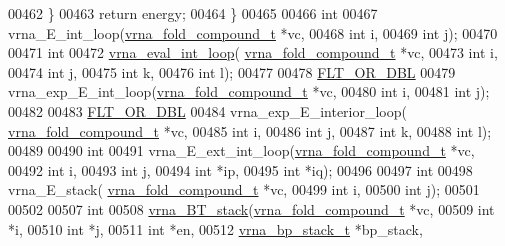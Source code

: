 \begin{DoxyCode}
00462   \}
00463   \textcolor{keywordflow}{return} energy;
00464 \}
00465 
00466 \textcolor{keywordtype}{int}
00467 vrna\_E\_int\_loop(\hyperlink{group__fold__compound_structvrna__fc__s}{vrna\_fold\_compound\_t} *vc,
00468                 \textcolor{keywordtype}{int} i,
00469                 \textcolor{keywordtype}{int} j);
00470 
00471 \textcolor{keywordtype}{int}
00472 \hyperlink{group__loops_ga018f1314dbbae42fdd27c94670b61721}{vrna\_eval\_int\_loop}( \hyperlink{group__fold__compound_structvrna__fc__s}{vrna\_fold\_compound\_t} *vc,
00473                     \textcolor{keywordtype}{int} i,
00474                     \textcolor{keywordtype}{int} j,
00475                     \textcolor{keywordtype}{int} k,
00476                     \textcolor{keywordtype}{int} l);
00477 
00478 \hyperlink{group__data__structures_ga31125aeace516926bf7f251f759b6126}{FLT\_OR\_DBL}
00479 vrna\_exp\_E\_int\_loop(\hyperlink{group__fold__compound_structvrna__fc__s}{vrna\_fold\_compound\_t} *vc,
00480                 \textcolor{keywordtype}{int} i,
00481                 \textcolor{keywordtype}{int} j);
00482 
00483 \hyperlink{group__data__structures_ga31125aeace516926bf7f251f759b6126}{FLT\_OR\_DBL}
00484 vrna\_exp\_E\_interior\_loop( \hyperlink{group__fold__compound_structvrna__fc__s}{vrna\_fold\_compound\_t} *vc,
00485                           \textcolor{keywordtype}{int} i,
00486                           \textcolor{keywordtype}{int} j,
00487                           \textcolor{keywordtype}{int} k,
00488                           \textcolor{keywordtype}{int} l);
00489 
00490 \textcolor{keywordtype}{int}
00491 vrna\_E\_ext\_int\_loop(\hyperlink{group__fold__compound_structvrna__fc__s}{vrna\_fold\_compound\_t} *vc,
00492                     \textcolor{keywordtype}{int} i,
00493                     \textcolor{keywordtype}{int} j,
00494                     \textcolor{keywordtype}{int} *ip,
00495                     \textcolor{keywordtype}{int} *iq);
00496 
00497 \textcolor{keywordtype}{int}
00498 vrna\_E\_stack( \hyperlink{group__fold__compound_structvrna__fc__s}{vrna\_fold\_compound\_t} *vc,
00499               \textcolor{keywordtype}{int} i,
00500               \textcolor{keywordtype}{int} j);
00501 
00502 
00507 \textcolor{keywordtype}{int}
00508 \hyperlink{group__loops_gad320d5d721e33bed120168213d8f45e5}{vrna\_BT\_stack}(\hyperlink{group__fold__compound_structvrna__fc__s}{vrna\_fold\_compound\_t} *vc,
00509               \textcolor{keywordtype}{int} *i,
00510               \textcolor{keywordtype}{int} *j,
00511               \textcolor{keywordtype}{int} *en,
00512               \hyperlink{group__data__structures_structvrna__bp__stack__s}{vrna\_bp\_stack\_t} *bp\_stack,

\end{DoxyCode}
